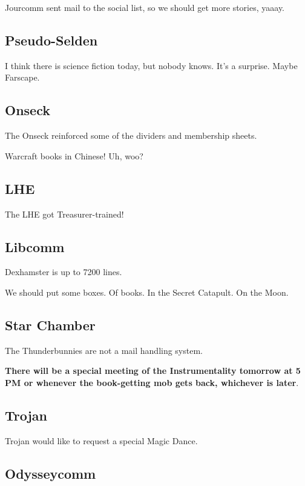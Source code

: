 \documentclass[10pt]{article}
\begin{document}
Jourcomm sent mail to the social list, so we should get more stories,
yaaay.

\subsection*{Pseudo-Selden}

I think there is science fiction today, but nobody knows.  It's a
surprise.  Maybe Farscape.

\subsection*{Onseck}

The Onseck reinforced some of the dividers and membership sheets.

Warcraft books in Chinese!  Uh, woo?

\subsection*{LHE}

The LHE got Treasurer-trained!

\subsection*{Libcomm}

Dexhamster is up to 7200 lines.

We should put some boxes.  Of books.  In the Secret Catapult.  On the
Moon.

\subsection*{Star Chamber}

The Thunderbunnies are not a mail handling system.

\textbf{There will be a special meeting of the Instrumentality
  tomorrow at 5 PM or whenever the book-getting mob gets back,
  whichever is later}.

\subsection*{Trojan}

Trojan would like to request a special Magic Dance.

\subsection*{Odysseycomm}
\end{document}

